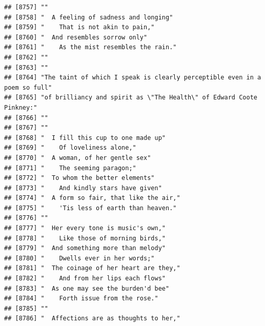 \documentclass{article}\usepackage[]{graphicx}\usepackage[]{color}
\makeatletter
\newenvironment{kframe}{%
 \def\at@end@of@kframe{}%
 \ifinner\ifhmode%
  \def\at@end@of@kframe{\end{minipage}}%
  \begin{minipage}{\columnwidth}%
 \fi\fi%
 \def\FrameCommand##1{\hskip\@totalleftmargin \hskip-\fboxsep
 \colorbox{shadecolor}{##1}\hskip-\fboxsep
     \hskip-\linewidth \hskip-\@totalleftmargin \hskip\columnwidth}%
 \MakeFramed {\advance\hsize-\width
   \@totalleftmargin\z@ \linewidth\hsize
   \@setminipage}}%
 {\par\unskip\endMakeFramed%
 \at@end@of@kframe}
\newenvironment{knitrout}{}{} %
\makeatother
\begin{document}
\begin{knitrout}
\begin{kframe}
\begin{verbatim}
## [8757] ""                                                                            
## [8758] "  A feeling of sadness and longing"                                          
## [8759] "    That is not akin to pain,"                                               
## [8760] "  And resembles sorrow only"                                                 
## [8761] "    As the mist resembles the rain."                                         
## [8762] ""                                                                            
## [8763] ""                                                                            
## [8764] "The taint of which I speak is clearly perceptible even in a poem so full"    
## [8765] "of brilliancy and spirit as \"The Health\" of Edward Coote Pinkney:"         
## [8766] ""                                                                            
## [8767] ""                                                                            
## [8768] "  I fill this cup to one made up"                                            
## [8769] "    Of loveliness alone,"                                                    
## [8770] "  A woman, of her gentle sex"                                                
## [8771] "    The seeming paragon;"                                                    
## [8772] "  To whom the better elements"                                               
## [8773] "    And kindly stars have given"                                             
## [8774] "  A form so fair, that like the air,"                                        
## [8775] "    'Tis less of earth than heaven."                                         
## [8776] ""                                                                            
## [8777] "  Her every tone is music's own,"                                            
## [8778] "    Like those of morning birds,"                                            
## [8779] "  And something more than melody"                                            
## [8780] "    Dwells ever in her words;"                                               
## [8781] "  The coinage of her heart are they,"                                        
## [8782] "    And from her lips each flows"                                            
## [8783] "  As one may see the burden'd bee"                                           
## [8784] "    Forth issue from the rose."                                              
## [8785] ""                                                                            
## [8786] "  Affections are as thoughts to her,"                                        

\end{verbatim}
\end{kframe}
\end{knitrout}
\end{document}
